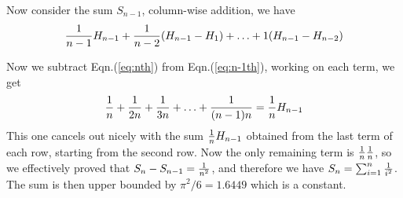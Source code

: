 \documentclass{article}
\begin{document}
Now consider the sum $S_{n-1}$, column-wise addition, we have
\begin{equation}\label{eq:n-1th}
  { \frac{1}{n-1} } H_{n-1} + { \frac{1}{n-2} } (H_{n-1} - H_1) + \ldots + 1 (H_{n-1}
  - H_{n-2})
\end{equation}

Now we subtract Eqn.(\ref{eq:nth}) from Eqn.(\ref{eq:n-1th}), working
on each term, we get
\begin{equation}
  \label{eq:sub}
  { \frac{1}{n} } + { \frac{1}{2n} } + { \frac{1}{3n} } + \ldots + { \frac{1}{(n-1)n} } = { \frac{1}{n} }H_{n-1}
\end{equation}
This one cancels out nicely with the sum ${ \frac{1}{n} } H_{n-1}$ obtained
from the last term of each row, starting from the second row. Now the
only remaining term is ${ \frac{1}{n} }{ \frac{1}{n} }$, so we effectively proved that
$S_n - S_{n-1} = { \frac{1}{n^2} }$, and therefore we have $S_n = \sum_{i=1}^n
{ \frac{1}{i^2} }$. The sum is then upper bounded by $\pi^2/6 = 1.6449$ which
is a constant.
\end{document}

